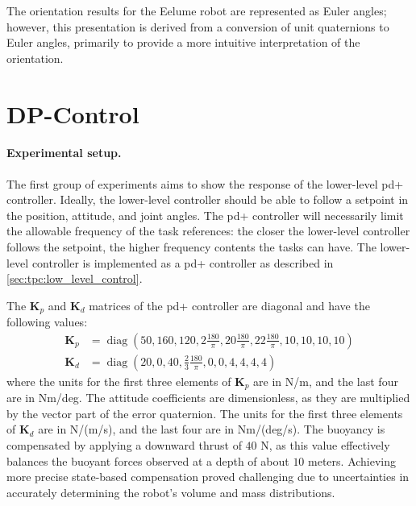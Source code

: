 The orientation results for the Eelume robot are represented as Euler angles; however, this presentation is derived from a conversion of unit quaternions to Euler angles, primarily to provide a more intuitive interpretation of the orientation.

\section{DP-Control}

\paragraph{Experimental setup.}
The first group of experiments aims to show the response of the lower-level \gls{pd+} controller.
Ideally, the lower-level controller should be able to follow a setpoint
in the position, attitude, and joint angles.
The \gls{pd+} controller will necessarily limit the allowable frequency of the task references:
the closer the lower-level controller follows the setpoint, the higher frequency contents
the tasks can have. The lower-level controller is implemented as a \gls{pd+} controller
as described in \autoref{sec:tpc:low_level_control}.

The \(\bm{K}_p\) and \(\bm{K}_d\) matrices of the \gls{pd+} controller are diagonal
and have the following values:
\begin{subequations}
\begin{align}
    \bm{K}_p &= \operatorname{diag}\left( 50, 160, 120, 2 \frac{180}{\pi}, 20 \frac{180}{\pi}, 22 \frac{180}{\pi}, 10, 10, 10, 10 \right) \\
    \bm{K}_d &= \operatorname{diag}\left( 20, 0, 40, \frac{2}{3} \frac{180}{\pi}, 0, 0, 4, 4, 4, 4 \right)
\end{align}
\end{subequations}
where the units for the first three elements of \(\bm{K}_p\) are in N/m, and the last four are in Nm/deg.
The attitude coefficients are dimensionless, as they are multiplied by the
vector part of the error quaternion. The units for the first three elements
of \(\bm{K}_d\) are in N/(m/s), and the last four are in Nm/(deg/s).
The buoyancy is compensated by applying a downward thrust of $40$ N, as this value effectively balances the buoyant forces observed at a depth of about $10$ meters. Achieving more precise state-based compensation proved challenging due to uncertainties in accurately determining the robot’s volume and mass distributions.

